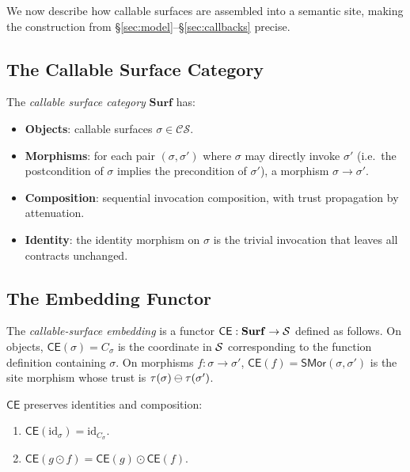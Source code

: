\documentclass[11pt]{article}
\newcommand{\CS}{\mathcal{CS}}                 %
\newcommand{\surf}{\sigma}                     %
\newcommand{\compose}{\mathbin{\odot}}         %
\newcommand{\SiteMor}{\mathsf{SMor}}           %
\newcommand{\ContEnv}{\mathsf{CE}}             %
\begin{document}
We now describe how callable surfaces are assembled into a semantic
site, making the construction from \S\ref{sec:model}--\S\ref{sec:callbacks}
precise.

\subsection{The Callable Surface Category}

\begin{definition}\label{def:surfcat}
The \emph{callable surface category} $\mathbf{Surf}$ has:
\begin{itemize}
  \item \textbf{Objects}: callable surfaces $\surf \in \CS$.
  \item \textbf{Morphisms}: for each pair $(\surf, \surf')$ where
        $\surf$ may directly invoke $\surf'$ (i.e.\ the
        postcondition of $\surf$ implies the precondition of
        $\surf'$), a morphism $\surf \to \surf'$.
  \item \textbf{Composition}: sequential invocation composition,
        with trust propagation by attenuation.
  \item \textbf{Identity}: the identity morphism on $\surf$ is the
        trivial invocation that leaves all contracts unchanged.
\end{itemize}
\end{definition}

\subsection{The Embedding Functor}

\begin{construction}\label{const:functor}
The \emph{callable-surface embedding} is a functor
$\ContEnv : \mathbf{Surf} \to \Site$ defined as follows.
On objects, $\ContEnv(\surf) = C_\surf$ is the coordinate in
$\mathcal{S}$ corresponding to the function definition containing $\surf$.
On morphisms $f : \surf \to \surf'$, $\ContEnv(f) = \SiteMor(\surf, \surf')$
is the site morphism whose trust is $\tau(\surf) \tatten \tau(\surf')$.
\end{construction}

\begin{proposition}\label{prop:functorlaw}
$\ContEnv$ preserves identities and composition:
\begin{enumerate}
  \item $\ContEnv(\mathrm{id}_\surf) = \mathrm{id}_{C_\surf}$.
  \item $\ContEnv(g \compose f) = \ContEnv(g) \compose \ContEnv(f)$.
\end{enumerate}
\end{proposition}
\end{document}
